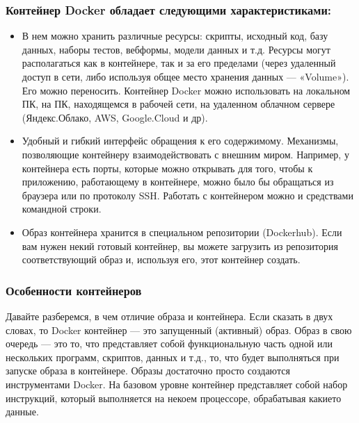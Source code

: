 \documentclass[letterpaper,10pt,russian]{sphinxmanual}
\begin{document}
\subsubsection{Контейнер Docker обладает следующими характеристиками:}
\label{\detokenize{educational_materials/docker_base/content:id10}}\begin{itemize}
\item {} 
\sphinxAtStartPar
В нем можно хранить различные ресурсы: скрипты, исходный код, базу данных, наборы тестов, веб\sphinxhyphen{}формы, модели данных и т.д. Ресурсы могут располагаться как в контейнере, так
и за его пределами (через удаленный доступ в сети, либо используя общее место хранения данных — «Volume»). Его можно переносить. Контейнер Docker можно использовать на
локальном ПК, на ПК, находящемся в рабочей сети, на удаленном облачном сервере (Яндекс.Облако, AWS, Google.Cloud и др).

\item {} 
\sphinxAtStartPar
Удобный и гибкий интерфейс обращения к его содержимому. Механизмы, позволяющие контейнеру взаимодействовать с внешним миром. Например, у контейнера есть порты, которые можно открывать для того, чтобы к приложению, работающему в контейнере, можно было бы обращаться из браузера или по протоколу SSH. Работать с контейнером можно и средствами командной строки.

\item {} 
\sphinxAtStartPar
Образ контейнера хранится в специальном репозитории (Docker\sphinxhyphen{}hub). Если вам нужен некий готовый контейнер, вы можете загрузить из репозитория соответствующий образ и, используя его, этот контейнер создать.

\end{itemize}


\subsubsection{Особенности контейнеров}
\label{\detokenize{educational_materials/docker_base/content:id11}}
\sphinxAtStartPar
Давайте разберемся, в чем отличие образа и контейнера. Если сказать в двух словах, то Docker контейнер — это запущенный (активный) образ. Образ в свою очередь — это то, что
представляет собой функциональную часть одной или нескольких программ, скриптов, данных и т.д., то, что будет выполняться при запуске образа в контейнере. Образы достаточно
просто создаются инструментами Docker. На базовом уровне контейнер представляет собой набор инструкций, который выполняется на некоем процессоре, обрабатывая какие\sphinxhyphen{}то
данные.
\end{document}
